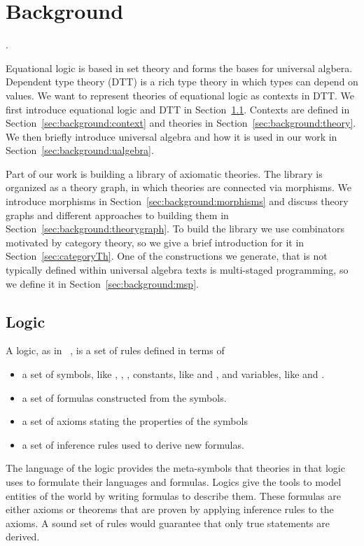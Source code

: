\chapter{Background}
\label{ch:background}
. 

Equational logic is based in set theory and forms the bases for universal algbera.  Dependent type theory (DTT) is a rich type theory in which types can depend on values. We want to represent theories of equational logic as contexts in DTT. We first introduce equational logic and DTT in Section~\ref{sec:background:logic}. 
Contexts are defined in Section~\ref{sec:background:context} and theories in Section~\ref{sec:background:theory}. We then briefly introduce universal algebra and how it is used in our work in Section~\ref{sec:background:ualgebra}. 

Part of our work is building a library of axiomatic theories. The library is organized as a theory graph, in which theories are connected via morphisms. We introduce morphisms in Section~\ref{sec:background:morphisms} and discuss theory graphs and different approaches to building them in Section~\ref{sec:background:theorygraph}. 
To build the library we use combinators motivated by category theory, so we give a brief introduction for it in Section~\ref{sec:categoryTh}. 
One of the constructions we generate, that is not typically defined within universal algebra texts is multi-staged programming, so we define it in Section~\ref{sec:background:msp}. 

\section{Logic}
\label{sec:background:logic}
A logic, as in ~\cite{Gries1993FormalLogic}, is a set of rules defined in terms of 
\begin{itemize}
\item a set of symbols, like \lstmath{=}, \lstmath{$\wedge$}, \lstmath{$\vee$}, constants, like  and , and variables, like  and . 
\item a set of formulas constructed from the symbols.  
\item a set of axioms stating the properties of the symbols  
\item a set of inference rules used to derive new formulas.  
\end{itemize}
The language of the logic provides the meta-symbols that theories in that logic uses to formulate their languages and formulas. Logics give the tools to model entities of the world by writing formulas to describe them. These formulas are either axioms or theorems that are proven by applying inference rules to the axioms. A sound set of rules would guarantee that only true statements are derived. 

